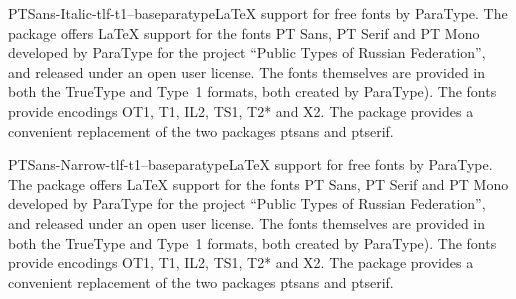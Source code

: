 \documentclass{ddltxtyp}
\begin{document}
\begin{package}{PTSans-Italic-tlf-t1--base}{paratype}{{\LaTeX} support for free fonts by ParaType.}
The package offers {\LaTeX} support for the fonts PT Sans, PT
Serif and PT Mono developed by ParaType for the project ``Public
Types of Russian Federation'', and released under an open user
license. The fonts themselves are provided in both the TrueType
and Type~1 formats, both created by ParaType). The fonts
provide encodings OT1, T1, IL2, TS1, T2* and X2. The package
provides a convenient replacement of the two packages ptsans
and ptserif.
\end{package}
\begin{package}{PTSans-Narrow-tlf-t1--base}{paratype}{{\LaTeX} support for free fonts by ParaType.}
The package offers {\LaTeX} support for the fonts PT Sans, PT
Serif and PT Mono developed by ParaType for the project ``Public
Types of Russian Federation'', and released under an open user
license. The fonts themselves are provided in both the TrueType
and Type~1 formats, both created by ParaType). The fonts
provide encodings OT1, T1, IL2, TS1, T2* and X2. The package
provides a convenient replacement of the two packages ptsans
and ptserif.
\end{package}
\end{document}
